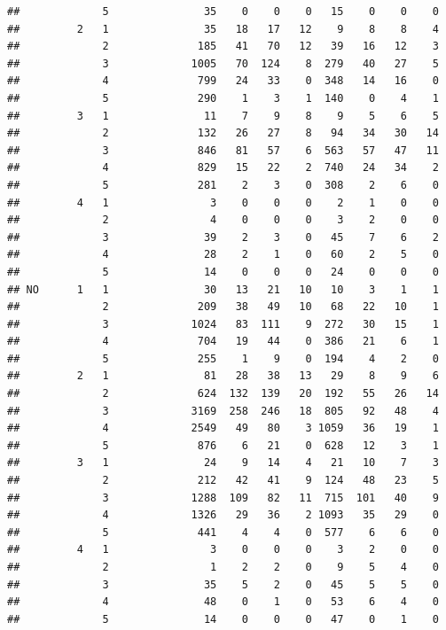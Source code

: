 \documentclass{article}\usepackage[]{graphicx}\usepackage[]{xcolor}
\makeatletter
\newenvironment{kframe}{%
 \def\at@end@of@kframe{}%
 \ifinner\ifhmode%
  \def\at@end@of@kframe{\end{minipage}}%
  \begin{minipage}{\columnwidth}%
 \fi\fi%
 \def\FrameCommand##1{\hskip\@totalleftmargin \hskip-\fboxsep
 \colorbox{shadecolor}{##1}\hskip-\fboxsep
     \hskip-\linewidth \hskip-\@totalleftmargin \hskip\columnwidth}%
 \MakeFramed {\advance\hsize-\width
   \@totalleftmargin\z@ \linewidth\hsize
   \@setminipage}}%
 {\par\unskip\endMakeFramed%
 \at@end@of@kframe}
\newenvironment{knitrout}{}{} %
\makeatother
\begin{document}
\begin{knitrout}
\begin{kframe}
\begin{verbatim}
##             5               35    0    0    0   15    0    0    0
##         2   1               35   18   17   12    9    8    8    4
##             2              185   41   70   12   39   16   12    3
##             3             1005   70  124    8  279   40   27    5
##             4              799   24   33    0  348   14   16    0
##             5              290    1    3    1  140    0    4    1
##         3   1               11    7    9    8    9    5    6    5
##             2              132   26   27    8   94   34   30   14
##             3              846   81   57    6  563   57   47   11
##             4              829   15   22    2  740   24   34    2
##             5              281    2    3    0  308    2    6    0
##         4   1                3    0    0    0    2    1    0    0
##             2                4    0    0    0    3    2    0    0
##             3               39    2    3    0   45    7    6    2
##             4               28    2    1    0   60    2    5    0
##             5               14    0    0    0   24    0    0    0
## NO      1   1               30   13   21   10   10    3    1    1
##             2              209   38   49   10   68   22   10    1
##             3             1024   83  111    9  272   30   15    1
##             4              704   19   44    0  386   21    6    1
##             5              255    1    9    0  194    4    2    0
##         2   1               81   28   38   13   29    8    9    6
##             2              624  132  139   20  192   55   26   14
##             3             3169  258  246   18  805   92   48    4
##             4             2549   49   80    3 1059   36   19    1
##             5              876    6   21    0  628   12    3    1
##         3   1               24    9   14    4   21   10    7    3
##             2              212   42   41    9  124   48   23    5
##             3             1288  109   82   11  715  101   40    9
##             4             1326   29   36    2 1093   35   29    0
##             5              441    4    4    0  577    6    6    0
##         4   1                3    0    0    0    3    2    0    0
##             2                1    2    2    0    9    5    4    0
##             3               35    5    2    0   45    5    5    0
##             4               48    0    1    0   53    6    4    0
##             5               14    0    0    0   47    0    1    0
\end{verbatim}
\end{kframe}
\end{knitrout}
    
\end{document}
